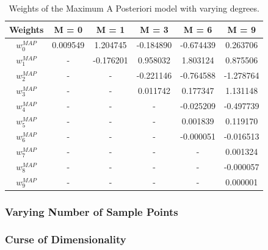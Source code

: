 \documentclass[12pt,twoside,a4paper]{article}
\begin{document}
\begin{table}[!htb]
\centering
\begin{tabular}{|c|c|c|c|c|c|}
\hline
\textbf{Weights}              & \textbf{M = 0} & \textbf{M = 1} & \textbf{M = 3} & \textbf{M = 6} & \textbf{M = 9} \\ \hline
\textit{\textbf{$w_0^{MAP}$}} & 0.009549       & 1.204745       & -0.184890      & -0.674439      & 0.263706       \\ \hline
\textit{\textbf{$w_1^{MAP}$}} & -              & -0.176201      & 0.958032       & 1.803124       & 0.875506       \\ \hline
\textit{\textbf{$w_2^{MAP}$}} & - & - & -0.221146 & -0.764588 & -1.278764 \\ \hline
\textit{\textbf{$w_3^{MAP}$}} & - & - & 0.011742  & 0.177347  & 1.131148  \\ \hline
\textit{\textbf{$w_4^{MAP}$}} & - & - & -         & -0.025209 & -0.497739 \\ \hline
\textit{\textbf{$w_5^{MAP}$}} & - & - & -         & 0.001839  & 0.119170  \\ \hline
\textit{\textbf{$w_6^{MAP}$}} & - & - & -         & -0.000051 & -0.016513 \\ \hline
\textit{\textbf{$w_7^{MAP}$}} & - & - & -         & -         & 0.001324  \\ \hline
\textit{\textbf{$w_8^{MAP}$}} & - & - & -         & -         & -0.000057 \\ \hline
\textit{\textbf{$w_9^{MAP}$}} & - & - & -         & -         & 0.000001  \\ \hline
\end{tabular}
\caption{Weights of the Maximum A Posteriori model with varying degrees.}
\label{MAPWEIGHTS}
\end{table}


\subsubsection{Varying Number of Sample Points}

\subsubsection{Curse of Dimensionality}

\pagebreak
\end{document}
